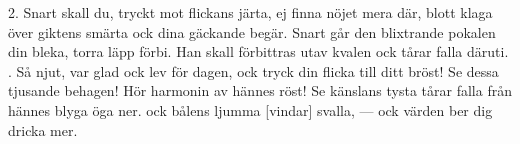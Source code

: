 \begin{multicols}{2}
2.  Snart skall du, tryckt mot flickans järta,
    ej finna nöjet mera där,
    blott klaga över giktens smärta
    ock dina gäckande begär.
    Snart går den blixtrande pokalen
    din bleka, torra läpp förbi.
    Han skall förbittras utav kvalen
    ock tårar falla däruti.
\vfill{}.  Så njut, var glad ock lev för dagen,
    ock tryck din flicka till ditt bröst!
    Se dessa tjusande behagen!
    Hör harmonin av hännes röst!
    Se känslans tysta tårar falla
    från hännes blyga öga ner.
    ock bålens ljumma [vindar] svalla,
    — ock värden ber dig dricka mer.
\end{multicols}
